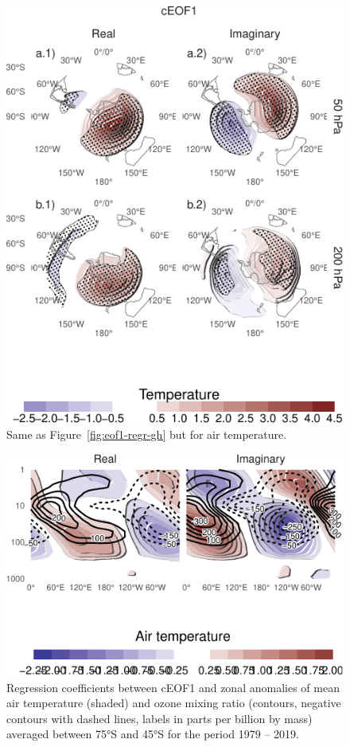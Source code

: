 \documentclass[smallextended]{svjour3}       %
\begin{document}
\begin{figure}
\centering
\includegraphics{../figures/eof1-regr-t-1.pdf}
\caption{\label{fig:eof1-regr-t}Same as Figure~\ref{fig:eof1-regr-gh} but for air temperature.}
\end{figure}



\begin{figure}
\centering
\includegraphics{../figures/t-vertical-1.pdf}
\caption{\label{fig:t-vertical}Regression coefficients between cEOF1 and zonal anomalies of mean air temperature (shaded) and ozone mixing ratio (contours, negative contours with dashed lines, labels in parts per billion by mass) averaged between 75°S and 45°S for the period 1979 -- 2019.}
\end{figure}
\end{document}
